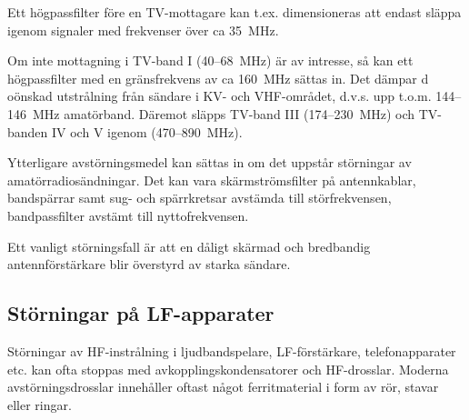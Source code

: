 Ett högpassfilter före en TV-mottagare kan t.ex. dimensioneras att endast släppa
igenom signaler med frekvenser över ca 35~MHz.

Om inte mottagning i TV-band I (40--68~MHz) är av intresse, så kan ett
högpassfilter med en gränsfrekvens av ca 160~MHz sättas in. Det dämpar d
oönskad utstrålning från sändare i KV- och VHF-området, d.v.s. upp
t.o.m. 144--146~MHz amatörband. Däremot släpps TV-band III (174--230~MHz) och
TV-banden IV och V igenom (470--890~MHz).

Ytterligare avstörningsmedel kan sättas in om det uppstår störningar av
amatörradiosändningar. Det kan vara skärmströmsfilter på antennkablar,
bandspärrar samt sug- och spärrkretsar avstämda till störfrekvensen,
bandpassfilter avstämt till nyttofrekvensen.

Ett vanligt störningsfall är att en dåligt skärmad och bredbandig
antennförstärkare blir överstyrd av starka sändare.

\subsection{Störningar på LF-apparater}

Störningar av HF-instrålning i ljudbandspelare, LF-förstärkare,
telefonapparater etc. kan ofta stoppas med avkopplingskondensatorer
och HF-drosslar. Moderna avstörningsdrosslar innehåller oftast något
ferritmaterial i form av rör, stavar eller ringar.
